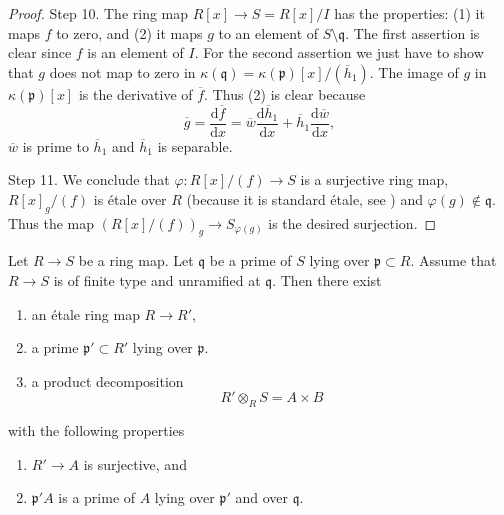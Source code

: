 \begin{proof}
\medskip\noindent
Step 10. The ring map $R[x] \to S = R[x]/I$ has the properties:
(1) it maps $f$ to zero, and
(2) it maps $g$ to an element of $S \setminus \mathfrak q$.
The first assertion is clear since $f$ is an element of $I$.
For the second assertion we just have to show that $g$ does
not map to zero in
$\kappa(\mathfrak q) = \kappa(\mathfrak p)[x]/(\overline{h}_1)$.
The image of $g$ in $\kappa(\mathfrak p)[x]$ is the derivative
of $\overline{f}$. Thus (2) is clear because
$$
\overline{g} =
\frac{\text{d}\overline{f}}{\text{d}x} =
\overline{w}\frac{\text{d}\overline{h}_1}{\text{d}x} +
\overline{h}_1\frac{\text{d}\overline{w}}{\text{d}x},
$$
$\overline{w}$ is prime to $\overline{h}_1$ and
$\overline{h}_1$ is separable.

\medskip\noindent
Step 11.
We conclude that $\varphi : R[x]/(f) \to S$ is a surjective ring map,
$R[x]_g/(f)$ is \'etale over $R$ (because it is standard \'etale,
see ) and $\varphi(g) \not \in \mathfrak q$.
Thus the map $(R[x]/(f))_g \to S_{\varphi(g)}$ is the desired
surjection.
\end{proof}



\begin{lemma}
\label{lemma-etale-makes-unramfied-closed-at-prime}
Let $R \to S$ be a ring map.
Let $\mathfrak q$ be a prime of $S$ lying over $\mathfrak p \subset R$.
Assume that $R \to S$ is of finite type and unramified at $\mathfrak q$.
Then there exist
\begin{enumerate}
\item an \'etale ring map $R \to R'$,
\item a prime $\mathfrak p' \subset R'$ lying over $\mathfrak p$.
\item a product decomposition
$$
R' \otimes_R S = A \times B
$$
\end{enumerate}
with the following properties
\begin{enumerate}
\item $R' \to A$ is surjective, and
\item $\mathfrak p'A$ is a prime of $A$ lying over $\mathfrak p'$ and
over $\mathfrak q$.
\end{enumerate}
\end{lemma}

